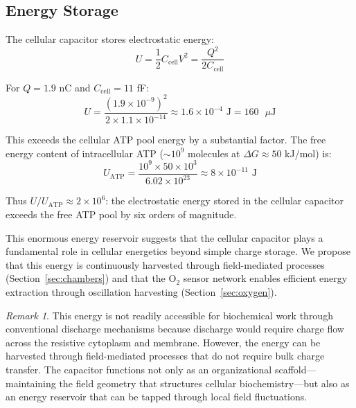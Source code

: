 \documentclass[twocolumn,10pt,aps,prd,superscriptaddress,floatfix,nofootinbib]{revtex4-2}
\theoremstyle{remark}
\newtheorem{remark}[theorem]{Remark}
\begin{document}
\subsection{Energy Storage}

The cellular capacitor stores electrostatic energy:
\begin{equation}
U = \frac{1}{2}C_{\mathrm{cell}}V^2 = \frac{Q^2}{2C_{\mathrm{cell}}}
\label{eq:energy_storage}
\end{equation}

For $Q = 1.9$ nC and $C_{\mathrm{cell}} = 11$ fF:
\begin{equation}
U = \frac{(1.9 \times 10^{-9})^2}{2 \times 1.1 \times 10^{-14}} \approx 1.6 \times 10^{-4} \text{ J} = 160 \text{ $\mu$J}
\end{equation}

This exceeds the cellular ATP pool energy by a substantial factor. The free energy content of intracellular ATP ($\sim 10^{9}$ molecules at $\Delta G \approx 50$ kJ/mol) is:
\begin{equation}
U_{\mathrm{ATP}} = \frac{10^{9} \times 50 \times 10^{3}}{6.02 \times 10^{23}} \approx 8 \times 10^{-11} \text{ J}
\end{equation}

Thus $U/U_{\mathrm{ATP}} \approx 2 \times 10^{6}$: the electrostatic energy stored in the cellular capacitor exceeds the free ATP pool by six orders of magnitude.

This enormous energy reservoir suggests that the cellular capacitor plays a fundamental role in cellular energetics beyond simple charge storage. We propose that this energy is continuously harvested through field-mediated processes (Section~\ref{sec:chambers}) and that the O$_2$ sensor network enables efficient energy extraction through oscillation harvesting (Section~\ref{sec:oxygen}).

\begin{remark}
This energy is not readily accessible for biochemical work through conventional discharge mechanisms because discharge would require charge flow across the resistive cytoplasm and membrane. However, the energy can be harvested through field-mediated processes that do not require bulk charge transfer. The capacitor functions not only as an organizational scaffold---maintaining the field geometry that structures cellular biochemistry---but also as an energy reservoir that can be tapped through local field fluctuations.
\end{remark}
\end{document}
